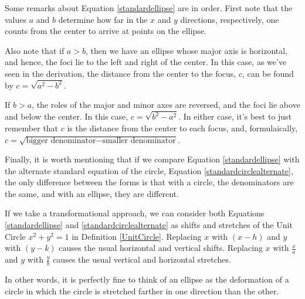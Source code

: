 \documentclass{ximera}
\begin{document}
  
 

Some remarks about Equation \ref{standardellipse} are in order.  First note that the values $a$ and $b$ determine how far in the $x$ and $y$ directions, respectively, one counts from the center to arrive at points on the ellipse.  

 

Also  note that if $a > b$, then we have an ellipse whose major axis is horizontal, and hence, the foci lie to the left and right of the center.  In this case, as we've seen in the derivation, the distance from the center to the focus, $c$, can be found by $c = \sqrt{a^2 - b^2}$. 

 

If $b > a$, the roles of the major and minor axes are reversed, and the foci lie above and below the center. In this case, $c = \sqrt{b^2 - a^2}$.  In either case, it's best to just remember that $c$ is the distance from the center to each focus, and, formulaically,  $c = \sqrt{\mbox{bigger denominator} - \mbox{smaller denominator}}$.  

 

Finally, it is worth mentioning that if we compare Equation \ref{standardellipse} with the alternate standard equation of the circle, Equation \ref{standardcirclealternate}, the only difference between the forms is that with a circle, the denominators are the same, and with an ellipse, they are different.  

 

If we take a transformational approach, we can consider both Equations \ref{standardellipse} and \ref{standardcirclealternate} as shifts and stretches of the Unit Circle $x^2 + y^2 = 1$ in Definition \ref{UnitCircle}.  Replacing $x$ with $(x-h)$ and $y$ with $(y-k)$ causes the usual horizontal and vertical shifts.  Replacing $x$ with $\frac{x}{a}$ and $y$ with $\frac{y}{b}$ causes the usual vertical and horizontal stretches. 

 

 In other words, it is perfectly fine to think of an ellipse as the deformation of a circle in which the circle is stretched farther in one direction than the other.


 
\end{document}
